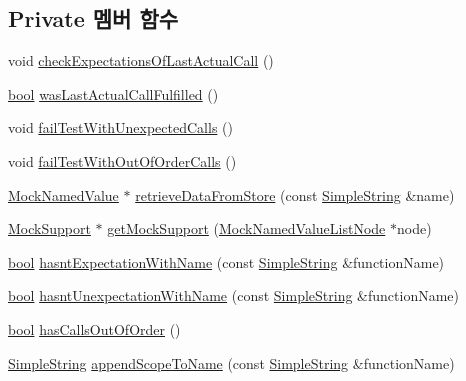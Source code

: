 \subsection*{Private 멤버 함수}
\begin{DoxyCompactItemize}
\item 
void \hyperlink{class_mock_support_a74d9a767d0ce83fb496ce64be8cf2851}{check\+Expectations\+Of\+Last\+Actual\+Call} ()
\item 
\hyperlink{avb__gptp_8h_af6a258d8f3ee5206d682d799316314b1}{bool} \hyperlink{class_mock_support_acd935c1e39f057e15d9d266481f2b1e1}{was\+Last\+Actual\+Call\+Fulfilled} ()
\item 
void \hyperlink{class_mock_support_a9eb46acf7715cffd19f883f1b3d69fbc}{fail\+Test\+With\+Unexpected\+Calls} ()
\item 
void \hyperlink{class_mock_support_ac2e23964ac5bc99117629d22524a4ce3}{fail\+Test\+With\+Out\+Of\+Order\+Calls} ()
\item 
\hyperlink{class_mock_named_value}{Mock\+Named\+Value} $\ast$ \hyperlink{class_mock_support_a768d0d8dc9e98b4ec064e01e21e14f85}{retrieve\+Data\+From\+Store} (const \hyperlink{class_simple_string}{Simple\+String} \&name)
\item 
\hyperlink{class_mock_support}{Mock\+Support} $\ast$ \hyperlink{class_mock_support_a575951d416e49f54fd1a3fc4823609e3}{get\+Mock\+Support} (\hyperlink{class_mock_named_value_list_node}{Mock\+Named\+Value\+List\+Node} $\ast$node)
\item 
\hyperlink{avb__gptp_8h_af6a258d8f3ee5206d682d799316314b1}{bool} \hyperlink{class_mock_support_a0ed7769953f8548c078fa38121442cdc}{hasnt\+Expectation\+With\+Name} (const \hyperlink{class_simple_string}{Simple\+String} \&function\+Name)
\item 
\hyperlink{avb__gptp_8h_af6a258d8f3ee5206d682d799316314b1}{bool} \hyperlink{class_mock_support_ab65f3afe77d40bf20402ba840fdb9d46}{hasnt\+Unexpectation\+With\+Name} (const \hyperlink{class_simple_string}{Simple\+String} \&function\+Name)
\item 
\hyperlink{avb__gptp_8h_af6a258d8f3ee5206d682d799316314b1}{bool} \hyperlink{class_mock_support_aa89b3718eac29065f072462df28ed6c3}{has\+Calls\+Out\+Of\+Order} ()
\item 
\hyperlink{class_simple_string}{Simple\+String} \hyperlink{class_mock_support_a42be7089fa18ff37b9d04b4caae95133}{append\+Scope\+To\+Name} (const \hyperlink{class_simple_string}{Simple\+String} \&function\+Name)
\end{DoxyCompactItemize}
